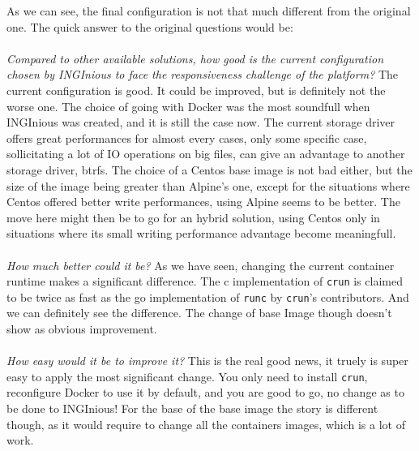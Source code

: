 As we can see, the final configuration is not that much different from the original one.  The quick answer to the original questions would be:
\paragraph{}\textit{Compared to other available solutions, how good is the current configuration chosen by INGInious to face the responsiveness challenge of the platform?}  The current configuration is good.  It could be improved, but is definitely not the worse one.  The choice of going with Docker was the most soundfull when INGInious was created, and it is still the case now.  The current storage driver offers great performances for almost every cases, only some specific case, sollicitating a lot of IO operations on big files, can give an advantage to another storage driver, btrfs.  The choice of a Centos base image is not bad either, but the size of the image being greater than Alpine's one, except for the situations where Centos offered better write performances, using Alpine seems to be better.  The move here might then be to go for an hybrid solution, using Centos only in situations where its small writing performance advantage become meaningfull.  
\paragraph{}\textit{How much better could it be?}  As we have seen, changing the current container runtime makes a significant difference.  The c implementation of \texttt{crun} is claimed to be twice as fast as the go implementation of \texttt{runc} by \texttt{crun}'s contributors.  And we can definitely see the difference.  The change of base Image though doesn't show as obvious improvement.
\paragraph{}\textit{How easy would it be to improve it?}  This is the real good news, it truely is super easy to apply the most significant change.  You only need to install \texttt{crun}, reconfigure Docker to use it by default, and you are good to go, no change as to be done to INGInious!  For the base of the base image the story is different though, as it would require to change all the containers images, which is a lot of work.

